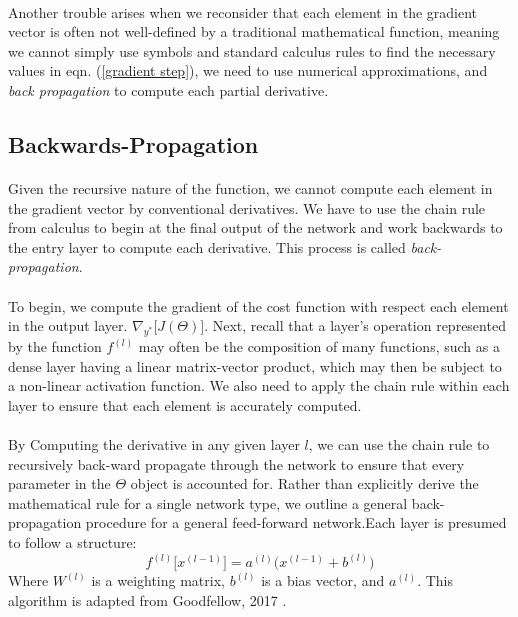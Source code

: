 \documentclass[12pt,letterpaper]{article}
\begin{document}
\paragraph*{}Another trouble arises when we reconsider that each element in the gradient vector is often not well-defined by a traditional mathematical function, meaning we cannot simply use symbols and standard calculus rules to find the necessary values in eqn. (\ref{gradient step}), we need to use numerical approximations, and \textit{back propagation} to compute each partial derivative. 

\subsection{Backwards-Propagation}

\paragraph*{}Given the recursive nature of the function, we cannot compute each element in the gradient vector by conventional derivatives. We have to use the chain rule from calculus to  begin at the final output of the network and work backwards to the entry layer to compute each derivative. This process is called \textit{back-propagation}. 

\paragraph*{}To begin, we compute the gradient of the cost function with respect each element in the output layer. $\nabla_{y^*}\big[J(\Theta)\big]$. Next, recall that a layer's operation represented by the function $f^{(l)}$ may often be the composition of many functions, such as a dense layer having a linear matrix-vector product, which may then be subject to a non-linear activation function. We also need to apply the chain rule within each layer to ensure that each element is accurately computed.

\paragraph*{}By Computing the derivative in any given layer $l$, we can use the chain rule to recursively back-ward propagate through the network to ensure that every parameter in the $\Theta$ object is accounted for. Rather than explicitly derive the mathematical rule for a single network type, we outline a general back-propagation procedure for a general feed-forward network.Each layer is presumed to follow a structure:
\begin{equation}
f^{(l)}\big[x^{(l-1)}\big] = a^{(l)}\Big( x^{(l-1)} + b^{(l)} \Big)
\end{equation}
Where $W^{(l)}$ is a weighting matrix, $b^{(l)}$ is a bias vector, and $a^{(l)}$. This algorithm is adapted from Goodfellow, 2017 \cite{Goodfellow}.
\end{document}
